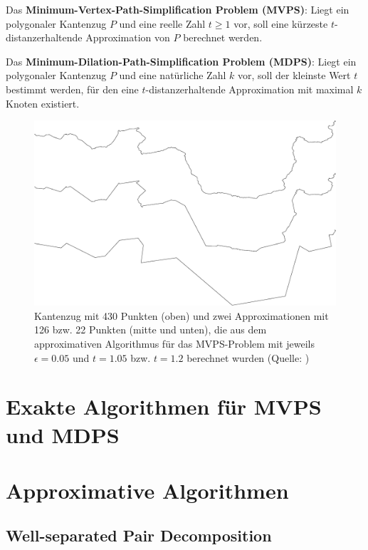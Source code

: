\documentclass[11pt]{article}
\begin{document}
	\noindent Das \textbf{Minimum-Vertex-Path-Simplification Problem (MVPS)}: Liegt ein polygonaler Kantenzug $P$ und eine reelle Zahl $t \geq 1$ vor, soll eine kürzeste $t$-distanzerhaltende Approximation von $P$ berechnet werden.
	
	\noindent Das \textbf{Minimum-Dilation-Path-Simplification Problem (MDPS)}: Liegt ein polygonaler Kantenzug $P$ und eine natürliche Zahl $k$ vor, soll der kleinste Wert $t$ bestimmt werden, für den eine $t$-distanzerhaltende Approximation mit maximal $k$ Knoten existiert.

    \begin{figure}
    	\centering
    	\begin{minipage}{.8\linewidth}
    		 \includegraphics[scale=0.15]{approximation_example}
    	\end{minipage}
    	\caption{Kantenzug mit 430 Punkten (oben) und zwei Approximationen mit 126 bzw. 22 Punkten (mitte und unten), die aus dem approximativen Algorithmus für das MVPS-Problem mit jeweils $\epsilon = 0.05$ und $t = 1.05$ bzw. $t = 1.2$ berechnet wurden (Quelle: \cite{gudmundsson})}
    \end{figure}

    \section{Exakte Algorithmen für MVPS und MDPS}
    \label{sec:exact}
    
    
    \section{Approximative Algorithmen}
    \label{sec:approximative}
    

    \subsection{Well-separated Pair Decomposition}
    \label{subsec:wspd}
    
    
\end{document}
